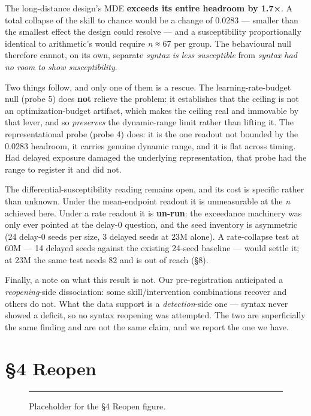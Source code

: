 \documentclass{article}
\begin{document}
The long-distance design's MDE \textbf{exceeds its entire headroom by 1.7×}. A total collapse of
the skill to chance would be a change of 0.0283 --- smaller than the smallest effect the
design could resolve --- and a susceptibility proportionally identical to arithmetic's would
require \emph{n} ≈ 67 per group. The behavioural null therefore cannot, on its own, separate
\emph{syntax is less susceptible} from \emph{syntax had no room to show susceptibility}.

Two things follow, and only one of them is a rescue. The learning-rate-budget null (probe
5) does \textbf{not} relieve the problem: it establishes that the ceiling is not an
optimization-budget artifact, which makes the ceiling real and immovable by that lever, and
so \emph{preserves} the dynamic-range limit rather than lifting it. The representational probe
(probe 4) does: it is the one readout not bounded by the 0.0283 headroom, it carries
genuine dynamic range, and it is flat across timing. Had delayed exposure damaged the
underlying representation, that probe had the range to register it and did not.

The differential-susceptibility reading remains open, and its cost is specific rather than
unknown. Under the mean-endpoint readout it is unmeasurable at the \emph{n} achieved here. Under
a rate readout it is \textbf{un-run}: the exceedance machinery was only ever pointed at the
delay-0 question, and the seed inventory is asymmetric (24 delay-0 seeds per size, 3 delayed
seeds at 23M alone). A rate-collapse test at 60M --- 14 delayed seeds against the existing
24-seed baseline --- would settle it; at 23M the same test needs 82 and is out of reach (§8).

Finally, a note on what this result is not. Our pre-registration anticipated a
\emph{reopening}-side dissociation: some skill/intervention combinations recover and others do
not. What the data support is a \emph{detection}-side one --- syntax never showed a deficit, so no
syntax reopening was attempted. The two are superficially the same finding and are not the
same claim, and we report the one we have.

\section{§4 Reopen}\label{reopen}

\begin{figure}[t]
\centering
\rule{\linewidth}{0.373\textheight}
\caption{Placeholder for the §4 Reopen figure.}
\end{figure}
\end{document}
